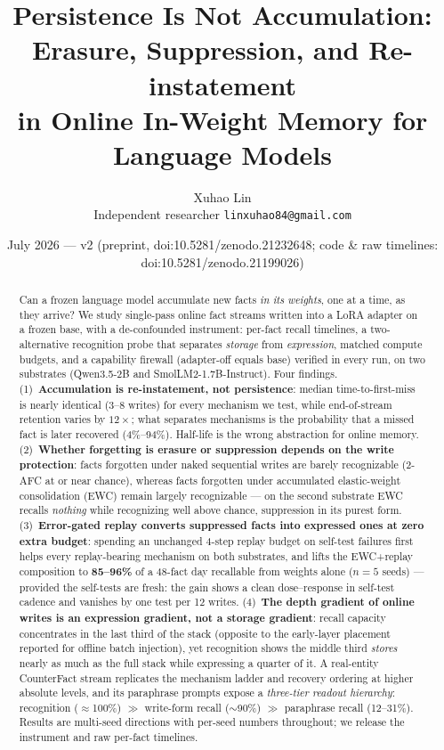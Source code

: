 \documentclass[11pt]{article}
\title{Persistence Is Not Accumulation:\\ Erasure, Suppression, and Re-instatement\\ in Online In-Weight Memory for Language Models}
\author{Xuhao Lin\\ \small Independent researcher \quad \texttt{linxuhao84@gmail.com}}
\date{July 2026 --- v2 (preprint, doi:10.5281/zenodo.21232648; code \& raw timelines: doi:10.5281/zenodo.21199026)}
\newcommand{\qwen}{Qwen3.5-2B}
\newcommand{\smol}{SmolLM2-1.7B-Instruct}
\begin{document}
\maketitle

\begin{abstract}
Can a frozen language model accumulate new facts \emph{in its weights}, one at a time, as they arrive?
We study single-pass online fact streams written into a LoRA adapter on a frozen base, with a
de-confounded instrument: per-fact recall timelines, a two-alternative recognition probe that separates
\emph{storage} from \emph{expression}, matched compute budgets, and a capability firewall (adapter-off
equals base) verified in every run, on two substrates (\qwen{} and \smol{}). Four findings.
(1)~\textbf{Accumulation is re-instatement, not persistence}: median time-to-first-miss is nearly
identical (3--8 writes) for every mechanism we test, while end-of-stream retention varies by
$12\times$; what separates mechanisms is the probability that a missed fact is later recovered
(4\%--94\%). Half-life is the wrong abstraction for online memory. (2)~\textbf{Whether forgetting is
erasure or suppression depends on the write protection}: facts forgotten under naked sequential writes
are barely recognizable (2-AFC at or near chance), whereas facts forgotten under accumulated
elastic-weight consolidation (EWC) remain largely recognizable --- on the second substrate EWC recalls
\emph{nothing} while recognizing well above chance, suppression in its purest form. (3)~\textbf{Error-gated
replay converts suppressed facts into expressed ones at zero extra budget}: spending an unchanged
4-step replay budget on self-test failures first helps every replay-bearing mechanism on both
substrates, and lifts the EWC+replay composition to \textbf{85--96\%} of a 48-fact day recallable from
weights alone ($n{=}5$ seeds) --- provided the self-tests are fresh: the gain shows a clean
dose--response in self-test cadence and vanishes by one test per 12 writes. (4)~\textbf{The depth
gradient of online writes is an expression gradient, not a storage gradient}: recall capacity
concentrates in the last third of the stack (opposite to the early-layer placement reported for
offline batch injection), yet recognition shows the middle third \emph{stores} nearly as much as the
full stack while expressing a quarter of it. A real-entity CounterFact stream replicates the mechanism ladder and
recovery ordering at higher absolute levels, and its paraphrase prompts expose a \emph{three-tier
readout hierarchy}: recognition ($\approx$100\%) $\gg$ write-form recall ($\sim$90\%) $\gg$
paraphrase recall (12--31\%). Results are multi-seed directions with per-seed numbers throughout; we
release the instrument and raw per-fact timelines.
\end{abstract}
\end{document}
